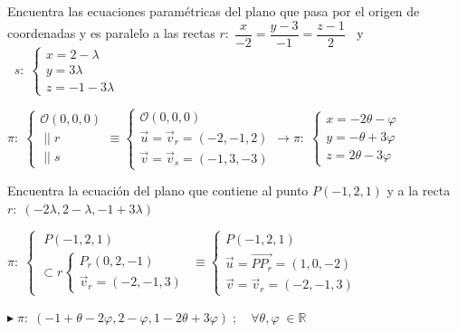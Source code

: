 \begin{ejre}
	Encuentra las ecuaciones paramétricas del plano que pasa por el origen de coordenadas y es paralelo a las rectas $r:\; \dfrac{x}{-2}=\dfrac{y-3}{-1}=\dfrac{z-1}{2}\;\;$ y $\;\;s:\; \begin{cases} x=2-\lambda \\ y=3\lambda \\ z=-1-3\lambda \end{cases}$
\end{ejre}

\begin{proofw}\renewcommand{\qedsymbol}{$\diamond$}
	$\pi:\; \begin{cases} \mathcal O(0,0,0) \\ \;||\;r \\ \;||\;s \end{cases} \equiv \begin{cases} \mathcal O(0,0,0) \\ \vec u=\vec v_r=(-2,-1,2) \\ \vec v=\vec v_s=(-1,3,-3) \end{cases} \to \pi:\; \begin{cases} x=-2\theta - \varphi \\ y=-\theta+3\varphi \\ z=2\theta-3\varphi \end{cases}$
\end{proofw}


\begin{ejre}
	Encuentra la ecuación del plano que contiene al punto $P(-1,2,1)$ y a la recta $r:\;(-2\lambda,2-\lambda,-1+3\lambda)$
\end{ejre}

\begin{proofw}\renewcommand{\qedsymbol}{$\diamond$}
	$\pi:\; \begin{cases}\;P(-1,2,1) \\ \subset r  
	\begin{cases} P_r(0,2,-1) \\ \vec v_r=(-2,-1,3) \end{cases}
	 \end{cases} \equiv \begin{cases}  P(-1,2,1) \\ \vec u=\overrightarrow{PP_r}=(1,0,-2) \\ \vec v=\vec v_r=(-2,-1,3) \end{cases}$
	 
\noindent $\blacktriangleright\; \pi:\; (-1+\theta-2\varphi, 2-\varphi, 1-2\theta+3\varphi)\;;\quad \forall \theta, \varphi \; \in \mathbb R$
\end{proofw}



